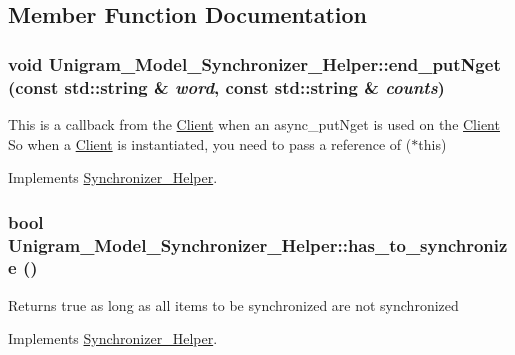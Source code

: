 \subsection{Member Function Documentation}
\hypertarget{class_unigram___model___synchronizer___helper_a07f7982f9ad12c616fef9d3abefe23e1}{
\subsubsection[{end\_\-putNget}]{\setlength{\rightskip}{0pt plus 5cm}void Unigram\_\-Model\_\-Synchronizer\_\-Helper::end\_\-putNget (const std::string \& {\em word}, \/  const std::string \& {\em counts})}}
\label{class_unigram___model___synchronizer___helper_a07f7982f9ad12c616fef9d3abefe23e1}
This is a callback from the \hyperlink{class_client}{Client} when an async\_\-putNget is used on the \hyperlink{class_client}{Client} So when a \hyperlink{class_client}{Client} is instantiated, you need to pass a reference of ($\ast$this) 

Implements \hyperlink{class_synchronizer___helper_a29ac0b4b630f56e59e6587bb6275d97e}{Synchronizer\_\-Helper}.

\hypertarget{class_unigram___model___synchronizer___helper_ac07d07668ba79d9748d2f52629ccf50e}{
\subsubsection[{has\_\-to\_\-synchronize}]{\setlength{\rightskip}{0pt plus 5cm}bool Unigram\_\-Model\_\-Synchronizer\_\-Helper::has\_\-to\_\-synchronize ()}}
\label{class_unigram___model___synchronizer___helper_ac07d07668ba79d9748d2f52629ccf50e}
Returns true as long as all items to be synchronized are not synchronized 

Implements \hyperlink{class_synchronizer___helper_a1d9c38f95c9a3a517e5a89659aa4c522}{Synchronizer\_\-Helper}.

